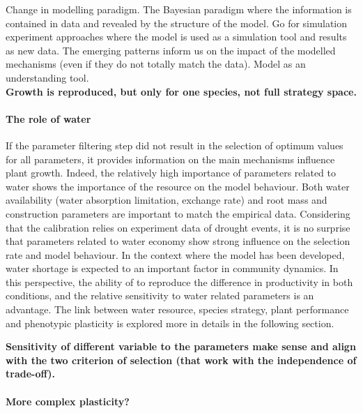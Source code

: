 Change in modelling paradigm. The Bayesian paradigm where the information is contained in data and revealed by the structure of the model. Go for simulation experiment approaches where the model is used as a simulation tool and results as new data. The emerging patterns inform us on the impact of the modelled mechanisms (even if they do not totally match the data). Model as an understanding tool.\\


\textbf{Growth is reproduced, but only for one species, not full strategy space.}

\paragraph{The role of water}

If the parameter filtering step did not result in the selection of optimum values for all parameters, it provides information on the main mechanisms influence plant growth. 
Indeed, the relatively high importance of parameters related to water shows the importance of the resource on the model behaviour. Both water availability (water absorption limitation, exchange rate) and root mass and construction parameters are important to match the empirical data. Considering that the calibration relies on experiment data of drought events, it is no surprise that parameters related to water economy show strong influence on the selection rate and model behaviour. In the context where the model has been developed, water shortage is expected to an important factor in community dynamics. In this perspective, the ability of \model to reproduce the difference in productivity in both conditions, and the relative sensitivity to water related parameters is an advantage. The link between water resource, species strategy, plant performance and phenotypic plasticity is explored more in details in the following section.



\textbf{Sensitivity of different variable to the parameters make sense and align with the two criterion of selection (that work with the independence of trade-off).}

\paragraph{More complex plasticity?}

